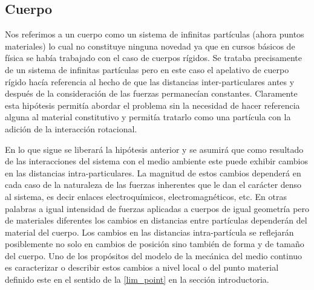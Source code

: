 \documentclass[../notas medios.tex]{subfiles}
\begin{document}
\subsection{Cuerpo}
Nos referimos a un cuerpo como un sistema de infinitas partículas (ahora puntos 
materiales) lo cual no constituye ninguna novedad ya que en cursos básicos de 
física se había trabajado con el caso de cuerpos rígidos.  Se trataba 
precisamente de un sistema de infinitas partículas pero en este caso el 
apelativo de cuerpo rígido hacía referencia al hecho de que las distancias 
inter-particulares antes y después de la consideración de las fuerzas 
permanecían constantes.  Claramente esta hipótesis permitía abordar el problema 
sin la necesidad de hacer referencia alguna al material constitutivo y permitía 
tratarlo como una partícula con la adición de la interacción rotacional.

En lo que sigue se liberará la hipótesis anterior y se asumirá que como 
resultado de las interacciones del sistema con el medio ambiente este puede 
exhibir cambios en las distancias intra-particulares.  La magnitud de estos 
cambios dependerá en cada caso de la naturaleza de las fuerzas inherentes que 
le dan el carácter denso al sistema, es decir enlaces electroquímicos, 
electromagnéticos, etc.  En otras palabras a igual intensidad de fuerzas 
aplicadas a cuerpos de igual geometría pero de materiales diferentes los 
cambios en distancias entre partículas dependerán del material del cuerpo.  Los 
cambios en las distancias intra-partícula se reflejarán posiblemente no solo en 
cambios de posición sino también de forma y de tamaño del cuerpo.  Uno de los 
propósitos del modelo de la mecánica del medio continuo es caracterizar o 
describir estos cambios a nivel local o del punto material definido este en el 
sentido de la \cref{lim_point} en la sección introductoria.
\end{document}
